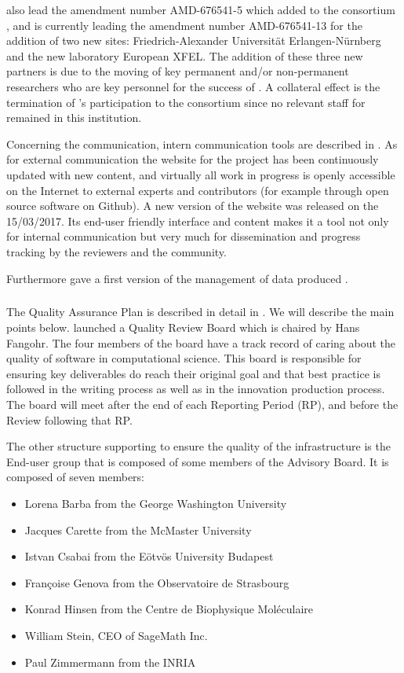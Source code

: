  also lead the amendment number AMD-676541-5 which added to the consortium , and is currently leading the amendment number AMD-676541-13 for the addition of two new sites: Friedrich-Alexander Universität Erlangen-Nürnberg and the new laboratory European XFEL. The addition of these three new partners is due to the moving of key permanent and/or non-permanent researchers who are key personnel for the success of \ODK. A collateral effect is the termination of 's participation to the consortium since no relevant staff for \ODK remained in this institution.


Concerning the communication, intern communication tools are described
in . As for external
communication the website for the project has been continuously
updated with new content, and virtually all work in progress is openly
accessible on the Internet to external experts and contributors (for
example through open source software on Github). A new version of the
website was released on the 15/03/2017. Its end-user friendly
interface and content makes it a tool not only for internal
communication but very much for dissemination and progress tracking by
the reviewers and the community.

Furthermore  gave a first version of the management of data produced \ODK.


\subparagraph{}


The Quality Assurance Plan is described in detail in
. We will describe the main points
below.   launched a Quality Review Board which is chaired by
Hans Fangohr. The four members of the board have a track record of
caring about the quality of software in computational science. This
board is responsible for ensuring key deliverables do reach their
original goal and that best practice is followed in the writing
process as well as in the innovation production process.  The board
will meet after the end of each Reporting Period (RP), and before the
Review following that RP.

The other structure supporting \ODK to ensure the quality of the
infrastructure is the End-user group that is composed of some members
of the Advisory Board. It is composed of seven members:

\begin{itemize}
\item{Lorena Barba from the George Washington University}
\item{Jacques Carette from the McMaster University}
\item{Istvan Csabai from the Eötvös University Budapest}
\item{Françoise Genova from the Observatoire de Strasbourg}
\item{Konrad Hinsen from the Centre de Biophysique Moléculaire}
\item{William Stein, CEO of SageMath Inc.}
\item{Paul Zimmermann from the INRIA}
\end{itemize}


